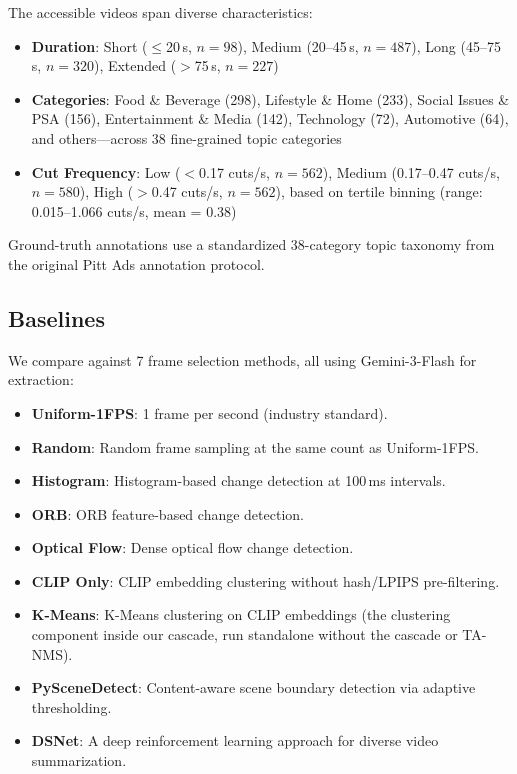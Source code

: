 \documentclass[sigconf,nonacm]{acmart}
\begin{document}
The accessible videos span diverse characteristics:
\begin{itemize}
    \item \textbf{Duration}: Short ($\leq$20\,s, $n{=}98$), Medium (20--45\,s, $n{=}487$), Long (45--75\,s, $n{=}320$), Extended ($>$75\,s, $n{=}227$)
    \item \textbf{Categories}: Food \& Beverage (298), Lifestyle \& Home (233), Social Issues \& PSA (156), Entertainment \& Media (142), Technology (72), Automotive (64), and others---across 38 fine-grained topic categories
    \item \textbf{Cut Frequency}: Low ($<$0.17 cuts/s, $n{=}562$), Medium (0.17--0.47 cuts/s, $n{=}580$), High ($>$0.47 cuts/s, $n{=}562$), based on tertile binning (range: 0.015--1.066 cuts/s, mean = 0.38)
\end{itemize}

Ground-truth annotations use a standardized 38-category topic taxonomy from the original Pitt Ads annotation protocol.

\subsection{Baselines}

We compare against 7 frame selection methods, all using Gemini-3-Flash for extraction:
\begin{itemize}
    \item \textbf{Uniform-1FPS}: 1 frame per second (industry standard).
    \item \textbf{Random}: Random frame sampling at the same count as Uniform-1FPS.
    \item \textbf{Histogram}: Histogram-based change detection at 100\,ms intervals.
    \item \textbf{ORB}: ORB feature-based change detection.
    \item \textbf{Optical Flow}: Dense optical flow change detection.
    \item \textbf{CLIP Only}: CLIP embedding clustering without hash/LPIPS pre-filtering.
    \item \textbf{K-Means}: K-Means clustering on CLIP embeddings (the clustering component inside our cascade, run standalone without the cascade or TA-NMS).
    \item \textbf{PySceneDetect}: Content-aware scene boundary detection via adaptive thresholding.
    \item \textbf{DSNet}: A deep reinforcement learning approach for diverse video summarization.
\end{itemize}
\end{document}
